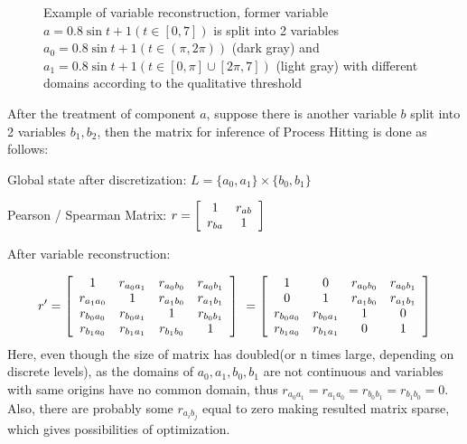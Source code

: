 \begin{figure}[ht]
\centering
{}
\caption[Variable reconstruction]{Example of variable reconstruction, former variable $a=0.8\sin t+1(t\in [0,7])$ is split into 2 variables $a_0=0.8\sin t+1(t\in (\pi,2\pi))$ (dark gray) and $a_1=0.8\sin t+1(t\in [0,\pi]\cup[2\pi,7])$ (light gray) with different domains according to the qualitative threshold}\label{varRec}
\end{figure}
After the treatment of component $a$, suppose there is another variable $b$ split into 2 variables $b_1,b_2$, then the matrix for inference of Process Hitting is done as follows:

Global state after discretization: $L=\{a_0,a_1\}\times \{b_0,b_1\}\ $

Pearson / Spearman Matrix: $r=\left[
\begin{array}{*{20}c}
1 & r_{ab}\\
r_{ba} & 1 \\
\end{array}
\right]\ 
$

After variable reconstruction:

$$r'=\left[
\begin{array}{*{20}c}
1 & r_{a_0a_1}& r_{a_0b_0}&r_{a_0b_1}\\
r_{a_1a_0} & 1& r_{a_1b_0}&r_{a_1b_1}\\
r_{b_0a_0} & r_{b_0a_1}& 1&r_{b_0b_1}\\
r_{b_1a_0} & r_{b_1a_1}& r_{b_1b_0}&1\\
\end{array}
\right]\ =\left[\begin{array}{*{20}c}
1 & 0& r_{a_0b_0}&r_{a_0b_1}\\
0 & 1& r_{a_1b_0}&r_{a_1b_1}\\
r_{b_0a_0} & r_{b_0a_1}& 1&0\\
r_{b_1a_0} & r_{b_1a_1}& 0&1\\
\end{array}\right]$$
Here, even though the size of matrix has doubled(or n times large, depending on discrete levels), as the domains of $a_0,a_1,b_0,b_1$ are not continuous and variables with same origins have no common domain, thus $r_{a_0a_1}=r_{a_1a_0}=r_{b_0b_1}=r_{b_1b_0}=0$. Also, there are probably some $r_{a_ib_j}$ equal to zero making resulted matrix sparse, which gives possibilities of optimization.
